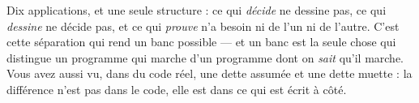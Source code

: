 \begin{partiebilan}
Dix applications, et une seule structure : ce qui \emph{décide} ne dessine pas, ce
qui \emph{dessine} ne décide pas, et ce qui \emph{prouve} n'a besoin ni de l'un ni
de l'autre. C'est cette séparation qui rend un banc possible --- et un banc est la
seule chose qui distingue un programme qui marche d'un programme dont on
\emph{sait} qu'il marche. Vous avez aussi vu, dans du code réel, une dette
assumée et une dette muette : la différence n'est pas dans le code, elle est dans
ce qui est écrit à côté.
\end{partiebilan}



